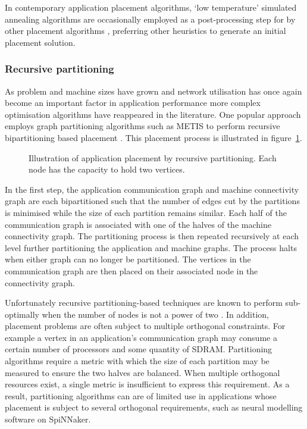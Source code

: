 				In contemporary application placement algorithms, `low temperature'
				simulated annealing algorithms are occasionally employed as a
				post-processing step for by other placement algorithms
				\cite{hoefler11}, preferring other heuristics to generate an initial
				placement solution.
				
			
			\subsubsection{Recursive partitioning}
				
				As problem and machine sizes have grown and network utilisation has
				once again become an important factor in application performance
				\cite{navaridas09b} more complex optimisation algorithms have
				reappeared in the literature. One popular approach employs graph
				partitioning algorithms such as METIS \cite{karypis98} to perform
				recursive bipartitioning based placement
				\cite{phillips14,hoefler11,pellegrini96}.  This placement process is
				illustrated in figure~\ref{fig:partitioning}.
				
				\begin{figure}
					\center
					
					\caption{Illustration of application placement by recursive
					partitioning. Each node has the capacity to hold two vertices.}
					\label{fig:partitioning}
				\end{figure}
				
				In the first step, the application communication graph and machine
				connectivity graph are each bipartitioned such that the number of edges
				cut by the partitions is minimised while the size of each partition
				remains similar. Each half of the communication graph is associated
				with one of the halves of the machine connectivity graph.  The
				partitioning process is then repeated recursively at each level further
				partitioning the application and machine graphs. The process halts when
				either graph can no longer be partitioned.  The vertices in the
				communication graph are then placed on their associated node in the
				connectivity graph.
				
				Unfortunately recursive partitioning-based techniques are known to
				perform sub-optimally when the number of nodes is not a power of two
				\cite{simon97}. In addition, placement problems are often subject to
				multiple orthogonal constraints. For example a vertex in an
				application's communication graph may consume a certain number of
				processors and some quantity of SDRAM. Partitioning algorithms require
				a metric with which the size of each partition may be measured to
				ensure the two halves are balanced. When multiple orthogonal resources
				exist, a single metric is insufficient to express this requirement. As
				a result, partitioning algorithms can are of limited use in
				applications whose placement is subject to several orthogonal
				requirements, such as neural modelling software on SpiNNaker.
				
